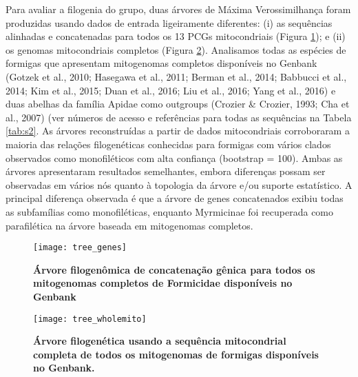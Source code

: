 \documentclass[../DISSERTACAO_MAIN.tex]{subfiles}
\begin{document}
	Para avaliar a filogenia do grupo, duas árvores de Máxima Verossimilhança foram produzidas usando dados de entrada ligeiramente diferentes: (i) as sequências alinhadas e concatenadas para todos os 13 PCGs mitocondriais (Figura \ref{fig:tree_genes}); e (ii) os genomas mitocondriais completos (Figura \ref{fig:tree_wholemito}). Analisamos todas as espécies de formigas que apresentam mitogenomas completos disponíveis no Genbank (Gotzek et al., 2010; Hasegawa et al., 2011; Berman et al., 2014; Babbucci et al., 2014; Kim et al., 2015; Duan et al., 2016; Liu et al., 2016; Yang et al., 2016) e duas abelhas da família Apidae como outgroups (Crozier \& Crozier, 1993; Cha et al., 2007) (ver números de acesso e referências para todas as sequências na Tabela \ref{tab:s2}. As árvores reconstruídas a partir de dados mitocondriais corroboraram a maioria das relações filogenéticas conhecidas para formigas com vários clados observados como monofiléticos com alta confiança (bootstrap = 100). Ambas as árvores apresentaram resultados semelhantes, embora diferenças possam ser observadas em vários nós quanto à topologia da árvore e/ou suporte estatístico. A principal diferença observada é que a árvore de genes concatenados exibiu todas as subfamílias como monofiléticas, enquanto Myrmicinae foi recuperada como parafilética na árvore baseada em mitogenomas completos. 
	
		\begin{figure}[htb]
		\texttt{[image: tree\_genes]}
		\caption[Árvore de concatenação gênica]{\textbf{Árvore filogenômica de concatenação gênica para todos os mitogenomas completos de Formicidae disponíveis no Genbank}}
		\label{fig:tree_genes}
	\end{figure}
	
	\begin{figure}[htb]
		\texttt{[image: tree\_wholemito]}
		\caption[Árvore de sequência mitocondrial completa]{\textbf{Árvore filogenética usando a sequência mitocondrial completa de todos os mitogenomas de formigas disponíveis no Genbank.}}
		\label{fig:tree_wholemito}
	\end{figure}
	
\end{document}
